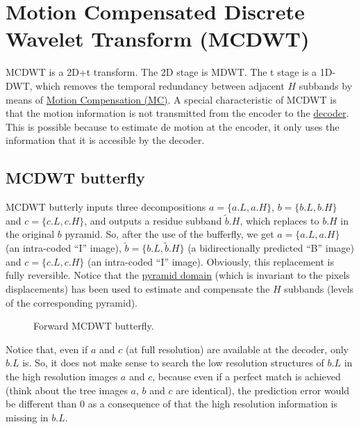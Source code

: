 \section{Motion Compensated Discrete Wavelet Transform (MCDWT)}
MCDWT is a 2D+t transform. The 2D stage is MDWT. The t stage is a
1D-DWT, which removes the temporal redundancy between adjacent $H$
subbands by means of
\href{https://en.wikipedia.org/wiki/Motion_compensation}{Motion
  Compensation (MC)}. A special characteristic of MCDWT is that the
motion information is not transmitted from the encoder to the
\href{https://en.wikipedia.org/wiki/Decoder}{decoder}. This is possible because to estimate de motion at the
encoder, it only uses the information that it is accesible by the
decoder.

\subsection{MCDWT butterfly}

MCDWT butterly inputs three decompositions $a=\{a.L, a.H\}$, $b=\{b.L,
b.H\}$ and $c=\{c.L, c.H\}$, and outputs a residue subband
$\tilde{b}.H$, which replaces to $b.H$ in the original $b$
pyramid. So, after the use of the bufferfly, we get $a=\{a.L, a.H\}$
(an intra-coded ``I'' image), $\tilde{b}=\{b.L, \tilde{b}.H\}$ (a
bidirectionally predicted ``B'' image) and $c=\{c.L, c.H\}$ (an
intra-coded ``I'' image). Obviously, this replacement is fully
reversible. Notice that the
\href{http://www.vtvt.ece.vt.edu/research/references/video/DCT_Video_Compression/Zhang92a.pdf}{pyramid
  domain} (which is invariant to the pixels displacements) has been
used to estimate and compensate the $H$ subbands (levels of the
corresponding pyramid).

\begin{figure}
\centering
{}
\caption{Forward MCDWT butterfly.}
\end{figure}


Notice that, even if $a$ and $c$ (at full resolution) are available at
the decoder, only $b.L$ is. So, it does not make sense to search the
low resolution structures of $b.L$ in the high resolution images $a$
and $c$, because even if a perfect match is achieved (think about the
tree images $a$, $b$ and $c$ are identical), the prediction error
would be different than $0$ as a consequence of that the high
resolution information is missing in $b.L$.

